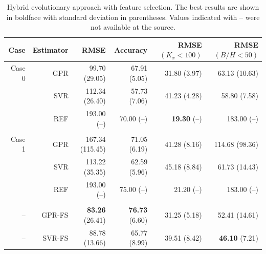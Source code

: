 \documentclass[a4paper,12pt, english]{article}
\begin{document}
% 
\begin{table}[!htb]
\centering
\caption{\label{tab:results_fs}  
Hybrid evolutionary approach with feature selection.
The best results are shown in boldface with standard deviation in parentheses. Values indicated with  -- were not available at the source.
}
\begin{tabular}{rrrrrr}
\hline
Case      & Estimator &                 RMSE &           Accuracy   &    RMSE$(K_x<100)$ &       RMSE$(B/H<50)$    \\\hline                                                               
   Case 0 &       GPR &         99.70  (29.05) &         67.91 (5.05)&       31.80 (3.97) &          63.13 (10.63) \\
          &       SVR &         112.34 (26.40) &         57.73 (7.06)&       41.23 (4.28) &         58.80 (7.58)   \\
          &       REF &            193.00 (--) &    {     70.00} (--)&  { \bf 19.30} (--) &            183.00 (--) \\\\
   Case 1 &       GPR &        167.34 (115.45) &         71.05 (6.19)&       41.28 (8.16) &         114.68 (98.36) \\
          &       SVR &        113.22  (35.35) &         62.59 (5.96)&       45.18 (8.84) &          61.73 (14.43) \\
          &       REF &            193.00 (--) &     {    75.00} (--)&  {     21.20} (--) &            183.00 (--) \\\\
   --     &    GPR-FS &   { \bf 83.26} (26.41) & { \bf 76.73} (6.60) &       31.25 (5.18) &        52.41 (14.61)   \\
   --     &    SVR-FS &          88.78 (13.66) &        65.77 (8.99) &       39.51 (8.42) &    { \bf 46.10} (7.21) \\
\hline 
\end{tabular} 
\end{table}
\end{document}
